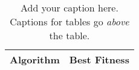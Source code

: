 %
%
\begin{table}[t]
    \centering
    \caption{
        \label{tab:plain-table}
        Add your caption here. Captions for tables go {\em above}
        the table.
    }
    \begin{tabular}{lr}
        \toprule
            {\bf Algorithm}  &
            {\bf Best Fitness}
            \\

        \midrule

        

        \bottomrule
    \end{tabular}
\end{table}